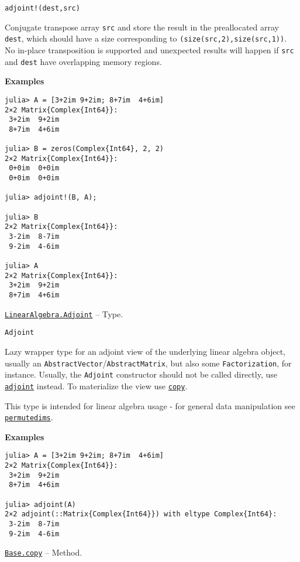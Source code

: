 \begin{adjustwidth}{2em}{0pt}


\begin{verbatim}
adjoint!(dest,src)
\end{verbatim}

Conjugate transpose array \texttt{src} and store the result in the preallocated array \texttt{dest}, which should have a size corresponding to \texttt{(size(src,2),size(src,1))}. No in-place transposition is supported and unexpected results will happen if \texttt{src} and \texttt{dest} have overlapping memory regions.

\textbf{Examples}


\begin{verbatim}
julia> A = [3+2im 9+2im; 8+7im  4+6im]
2×2 Matrix{Complex{Int64}}:
 3+2im  9+2im
 8+7im  4+6im

julia> B = zeros(Complex{Int64}, 2, 2)
2×2 Matrix{Complex{Int64}}:
 0+0im  0+0im
 0+0im  0+0im

julia> adjoint!(B, A);

julia> B
2×2 Matrix{Complex{Int64}}:
 3-2im  8-7im
 9-2im  4-6im

julia> A
2×2 Matrix{Complex{Int64}}:
 3+2im  9+2im
 8+7im  4+6im
\end{verbatim}



\end{adjustwidth}
\hypertarget{10784859587547982593}{}
\hyperlink{10784859587547982593}{\texttt{LinearAlgebra.Adjoint}}  -- {Type.}

\begin{adjustwidth}{2em}{0pt}


\begin{verbatim}
Adjoint
\end{verbatim}

Lazy wrapper type for an adjoint view of the underlying linear algebra object, usually an \texttt{AbstractVector}/\texttt{AbstractMatrix}, but also some \texttt{Factorization}, for instance. Usually, the \texttt{Adjoint} constructor should not be called directly, use \hyperlink{10565518144285607255}{\texttt{adjoint}} instead. To materialize the view use \hyperlink{15665284441316555522}{\texttt{copy}}.

This type is intended for linear algebra usage - for general data manipulation see \hyperlink{10913801624539723467}{\texttt{permutedims}}.

\textbf{Examples}


\begin{verbatim}
julia> A = [3+2im 9+2im; 8+7im  4+6im]
2×2 Matrix{Complex{Int64}}:
 3+2im  9+2im
 8+7im  4+6im

julia> adjoint(A)
2×2 adjoint(::Matrix{Complex{Int64}}) with eltype Complex{Int64}:
 3-2im  8-7im
 9-2im  4-6im
\end{verbatim}



\end{adjustwidth}
\hypertarget{16739145811029380235}{}
\hyperlink{16739145811029380235}{\texttt{Base.copy}}  -- {Method.}

